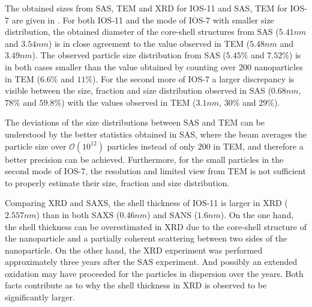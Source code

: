 \documentclass[\main/dresen_thesis.tex]{subfiles}
\begin{document}
    The obtained sizes from SAS, TEM and XRD for IOS-11 and SAS, TEM for IOS-7 are given in .
    For both IOS-11 and the mode of IOS-7 with smaller size distribution, the obtained diameter of the core-shell structures from SAS ($5.41 \unit{nm}$ and $3.54 \unit{nm}$) is in close agreement to the value observed in TEM ($5.48 \unit{nm}$ and $3.49 \unit{nm}$).
    The observed particle size distribution from SAS ($5.45 \unit{\%}$ and $7.52 \unit{\%}$) is in both cases smaller than the value obtained by counting over $200$ nanoparticles in TEM ($6.6 \unit{\%}$ and $11 \unit{\%}$).
    For the second more of IOS-7 a larger discrepancy is visible between the size, fraction and size distribution observed in SAS ($0.68 \unit{nm}$, $78 \unit{\%}$ and $59.8 \unit{\%}$) with the values observed in TEM ($3.1 \unit{nm}$, $30 \unit{\%}$ and $29 \unit{\%}$).

    The deviations of the size distributions between SAS and TEM can be understood by the better statistics obtained in SAS, where the beam averages the particle size over $\mathcal{O}(10^{12})$ particles instead of only $200$ in TEM, and therefore a better precision can be achieved.
    Furthermore, for the small particles in the second mode of IOS-7, the resolution and limited view from TEM is not sufficient to properly estimate their size, fraction and size distribution.

    Comparing XRD and SAXS, the shell thickness of IOS-11 is larger in XRD ($2.557 \unit{nm}$) than in both SAXS ($0.46 \unit{nm}$) and SANS ($1.6 \unit{nm}$).
    On the one hand, the shell thickness can be overestimated in XRD due to the core-shell structure of the nanoparticle and a partially coherent scattering between two sides of the nanoparticle.
    On the other hand, the XRD experiment was performed approximately three years after the SAS experiment.
    And possibly an extended oxidation may have proceeded for the particles in dispersion over the years.
    Both facts contribute as to why the shell thickness in XRD is observed to be significantly larger.
\end{document}
